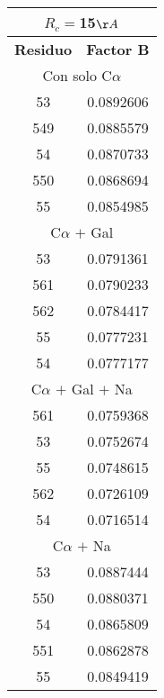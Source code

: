 \begin{tabular}[c]{|c|c|}
\multicolumn{2}{c}{$R_c=$15$\AA$}\\\hline
\textbf{Residuo}&\textbf{Factor B}\\\hline
\multicolumn{2}{c}{Con solo C$\alpha$}\\\hline
        53& 0.0892606\\
       549& 0.0885579\\
        54& 0.0870733\\
       550& 0.0868694\\
        55& 0.0854985\\\hline
\multicolumn{2}{c}{C$\alpha$ $+$ Gal}\\\hline
        53& 0.0791361\\
       561& 0.0790233\\
       562& 0.0784417\\
        55& 0.0777231\\
        54& 0.0777177\\\hline
\multicolumn{2}{c}{C$\alpha$ $+$ Gal $+$ Na}\\\hline
       561& 0.0759368\\
        53& 0.0752674\\
        55& 0.0748615\\
       562& 0.0726109\\
        54& 0.0716514\\\hline
\multicolumn{2}{c}{C$\alpha$ $+$ Na}\\\hline
        53& 0.0887444\\
       550& 0.0880371\\
        54& 0.0865809\\
       551& 0.0862878\\
        55& 0.0849419\\\hline
\end{tabular}
